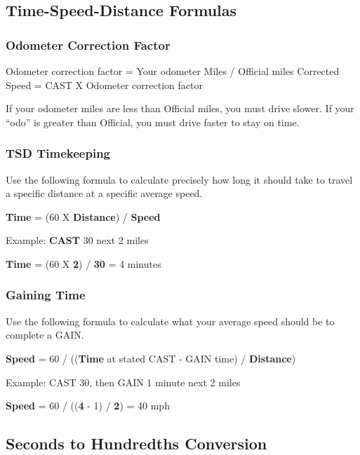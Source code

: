 \subsection{Time-Speed-Distance Formulas}
\subsubsection{Odometer Correction Factor}
\indent Odometer correction factor = Your odometer Miles / Official miles
\indent Corrected Speed = CAST X Odometer correction factor

If your odometer miles are less than Official miles, you must drive slower. If your “odo” is greater than Official, you must drive faster to stay on time.

\subsubsection{TSD Timekeeping}
Use the following formula to calculate precisely how long it should
take to travel a specific distance at a specific average speed.

\indent \textbf{Time} = (60 X \textbf{Distance}) / \textbf{Speed}

\indent Example: \textbf{CAST} 30 next 2 miles

\indent \textbf{Time} = (60 X \textbf{2}) / \textbf{30} = 4 minutes

\subsubsection{Gaining Time}
Use the following formula to calculate what your average speed
should be to complete a GAIN.

\indent \textbf{Speed} = 60 / ((\textbf{Time} at stated CAST - GAIN time) / \textbf{Distance})

\indent Example: CAST 30, then GAIN 1 minute next 2 miles

\indent \textbf{Speed} = 60 / ((\textbf{4} - 1) / \textbf{2}) = 40 mph

\subsection{Seconds to Hundredths Conversion}

